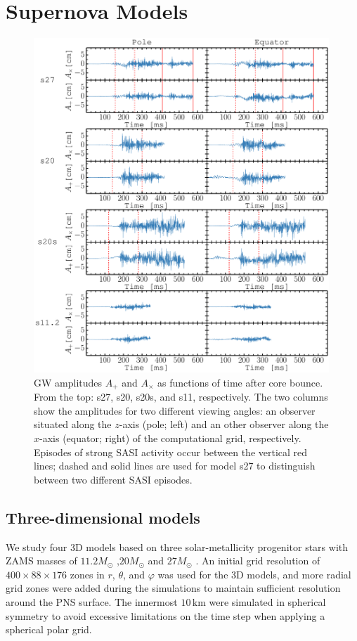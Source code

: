 \section{Supernova Models}
\label{sec:numerics}

\begin{figure}
\centering
\includegraphics[width=0.99\textwidth]{./images/paper1/fig1.pdf}
\caption{GW amplitudes $A_+$ and $A_\times$ as functions of time
  after core bounce.
  From the top: s27, s20, s20s, and s11, respectively. 
  The two columns show the amplitudes for two different viewing angles: an observer
  situated along the $z$-axis (pole; left) and an other observer along the $x$-axis (equator; right) of the computational grid, respectively.
  Episodes of strong SASI activity occur between the vertical red lines; dashed and solid lines are used for
  model s27 to distinguish between two different SASI episodes.
\label{fig:amps}}
\end{figure}
\subsection{Three-dimensional models}
We study four 3D models based on three solar-metallicity progenitor stars with ZAMS masses of $11.2 M_\odot$ \citep{woosley_02},$20 M_\odot$ \citep{woosley_07} and $27 M_\odot$ \citep{woosley_02}. 
{An initial grid resolution of $400\times 88 \times 176$ zones in $r$, $\theta$, and $\varphi$ was used for the 3D models, and more radial grid zones were added
during the simulations to maintain sufficient resolution around the PNS surface.}
{The innermost $10 \, \mathrm{km}$ were simulated in spherical symmetry to avoid
excessive limitations on the time step when applying a spherical polar grid.}

